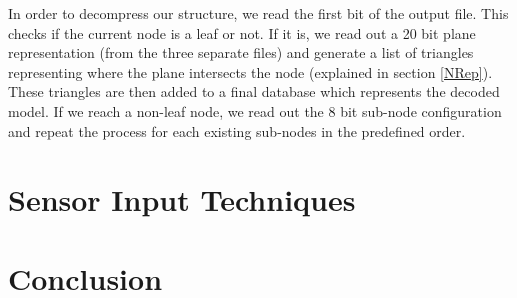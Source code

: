 In order to decompress our structure, we read the first bit of the output file. This checks if the current node is a leaf or not. If it is, we read out a 20 bit plane representation (from the three separate files) and generate a list of triangles representing where the plane intersects the node (explained in section \ref{NRep}). These triangles are then added to a final database which represents the decoded model. If we reach a non-leaf node, we read out the 8 bit sub-node configuration and repeat the process for each existing sub-nodes in the predefined order. \\  


\section{Sensor Input Techniques}



\section{Conclusion}